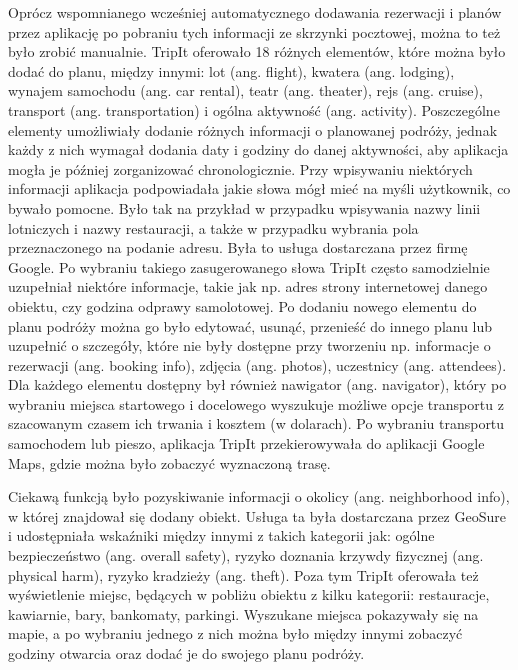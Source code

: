 \documentclass[10pt,twoside,a4paper]{report}
\begin{document}
\par Oprócz wspomnianego wcześniej automatycznego dodawania rezerwacji i planów przez aplikację po pobraniu tych informacji ze skrzynki pocztowej, można to też było zrobić manualnie. TripIt oferowało 18 różnych elementów, które można było dodać do planu, między innymi: lot (ang. flight), kwatera (ang. lodging), wynajem samochodu (ang. car rental), teatr (ang. theater), rejs (ang. cruise), transport (ang. transportation) i ogólna aktywność (ang. activity). Poszczególne elementy umożliwiały dodanie różnych informacji o planowanej podróży, jednak każdy z nich wymagał dodania daty i godziny do danej aktywności, aby aplikacja mogła je później zorganizować chronologicznie. Przy wpisywaniu niektórych informacji aplikacja podpowiadała jakie słowa mógł mieć na myśli użytkownik, co bywało pomocne. Było tak na przykład w przypadku wpisywania nazwy linii lotniczych i nazwy restauracji, a także w przypadku wybrania pola przeznaczonego na podanie adresu. Była to usługa dostarczana przez firmę Google. Po wybraniu takiego zasugerowanego słowa TripIt często samodzielnie uzupełniał niektóre informacje, takie jak np. adres strony internetowej danego obiektu, czy godzina odprawy samolotowej.
Po dodaniu nowego elementu do planu podróży można go było edytować, usunąć, przenieść do innego planu lub uzupełnić o szczegóły, które nie były dostępne przy tworzeniu np. informacje o rezerwacji (ang. booking info), zdjęcia (ang. photos), uczestnicy (ang. attendees). Dla każdego elementu dostępny był również nawigator (ang. navigator), który po wybraniu miejsca startowego i docelowego wyszukuje możliwe opcje transportu z szacowanym czasem ich trwania i kosztem (w dolarach). Po wybraniu transportu samochodem lub pieszo, aplikacja TripIt przekierowywała do aplikacji Google Maps, gdzie można było zobaczyć wyznaczoną trasę.

\par Ciekawą funkcją było pozyskiwanie informacji o okolicy (ang. neighborhood info), w której znajdował się dodany obiekt. Usługa ta była dostarczana przez GeoSure i udostępniała wskaźniki między innymi z takich kategorii jak: ogólne bezpieczeństwo (ang. overall safety), ryzyko doznania krzywdy fizycznej (ang. physical harm), ryzyko kradzieży (ang. theft). Poza tym TripIt oferowała też wyświetlenie miejsc, będących w pobliżu obiektu z kilku kategorii: restauracje, kawiarnie, bary, bankomaty, parkingi. Wyszukane miejsca pokazywały się na mapie, a po wybraniu jednego z nich można było między innymi zobaczyć godziny otwarcia oraz dodać je do swojego planu podróży.
\end{document}

